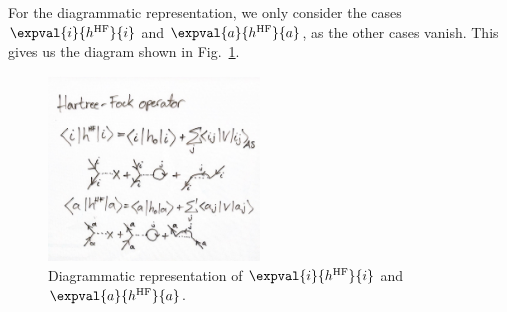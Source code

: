 For the diagrammatic representation, we only consider the cases $\expval{i}{h^\HF}{i}$ and $\expval{a}{h^\HF}{a}$, as the other cases vanish.
This gives us the diagram shown in Fig.~\ref{fig:HF-diagram}.

\begin{figure}[ht]
    \centering
    \includegraphics[width=0.5\textwidth]{figs/HF-operator.pdf}
    \caption{Diagrammatic representation of $\expval{i}{h^\HF}{i}$ and $\expval{a}{h^\HF}{a}$.\label{fig:HF-diagram}}
\end{figure}
